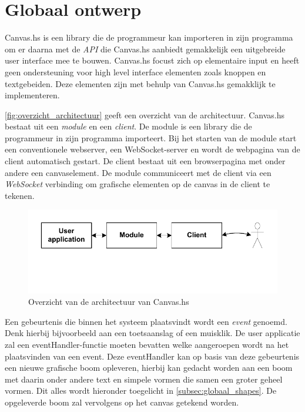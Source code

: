 \section{Globaal ontwerp}  \label{sec:globaal}
Canvas.hs is een library die de programmeur kan importeren in zijn programma om er daarna met de \emph{API} die Canvas.hs aanbiedt gemakkelijk een uitgebreide user interface mee te bouwen. Canvas.hs focust zich op elementaire input en heeft geen ondersteuning voor high level interface elementen zoals knoppen en textgebeiden. Deze elementen zijn met behulp van Canvas.hs gemakklijk te implementeren.

\autoref{fig:overzicht_architectuur} geeft een overzicht van de architectuur. Canvas.hs bestaat uit een \emph{module} en een \emph{client}. De module is een library die de programmeur in zijn programma importeert. Bij het starten van de module start een conventionele webserver, een WebSocket-server en wordt de webpagina van de client automatisch gestart. De client bestaat uit een browserpagina met onder andere een canvaselement. De module communiceert met de client via een \emph{WebSocket} verbinding om grafische elementen op de canvas in de client te tekenen.

\begin{figure}[H]
\begin{center}
\includegraphics[keepaspectratio,width=\textwidth]{./images/architecture_overzicht_poster.pdf}
\caption{Overzicht van de architectuur van Canvas.hs}
\label{fig:overzicht_architectuur}
\end{center}
\end{figure}

Een gebeurtenis die binnen het systeem plaatsvindt wordt een \emph{event} genoemd. Denk hierbij bijvoorbeeld aan een toetsaanslag of een muisklik. De user applicatie zal een eventHandler-functie moeten bevatten welke aangeroepen wordt na het plaatsvinden van een event. Deze eventHandler kan op basis van deze gebeurtenis een nieuwe grafische boom opleveren, hierbij kan gedacht worden aan een boom met daarin onder andere text en simpele vormen die samen een groter geheel vormen. Dit alles wordt hieronder toegelicht in \autoref{subsec:globaal_shapes}. De opgeleverde boom zal vervolgens op het canvas getekend worden. 

